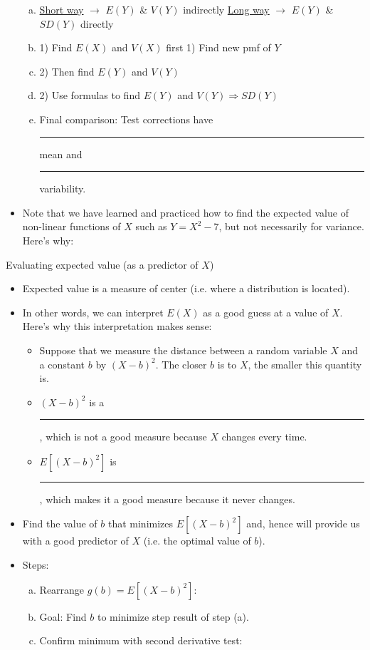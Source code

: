 \documentclass{article}
\newcommand{\blankul}[1]{\rule[-1.5mm]{#1}{0.15mm}}	%
\begin{document}
\begin{itemize}
\begin{enumerate}[(a)]
        \item[] \ul{Short way} $\rightarrow$ $E(Y)$ \& $V(Y)$ indirectly \hspace{10pt} \ul{Long way} $\rightarrow$ $E(Y)$ \& $SD(Y)$ directly
        \item[] 1) Find $E(X)$ and $V(X)$ first \hspace{85pt} 1) Find new pmf of $Y$
        \item[] \hfill 2) Then find $E(Y)$ and $V(Y)$\vspace{70pt}
        \item[] 2) Use formulas to find $E(Y)$ and $V(Y) \Rightarrow SD(Y)$\vspace{50pt}
        \item[] Final comparison: Test corrections have \blankul{2cm} mean and \blankul{2cm} variability.
    \end{enumerate}
    \item Note that we have learned and practiced how to find the expected value of non-linear functions of $X$ such as $Y = X^2 - 7$, but not necessarily for variance. Here's why:
\end{itemize}\vspace{140pt}

Evaluating expected value (as a predictor of $X$)\bigskip
\begin{itemize}
    \item Expected value is a measure of center (i.e. where a distribution is located).
    \item[] In other words, we can interpret $E(X)$ as a good guess at a value of $X$. Here's why this interpretation makes sense:
    \begin{itemize}
        \item Suppose that we measure the distance between a random variable $X$ and a constant $b$ by $(X - b)^2$. The closer $b$ is to $X$, the smaller this quantity is.
        \item[] $(X - b)^2$ is a \blankul{3cm}, which is not a good measure because $X$ changes every time.
        \item[] $E[(X - b)^2]$ is \blankul{2cm}, which makes it a good measure because it never changes.
    \end{itemize}\bigskip
    \item Find the value of $b$ that minimizes $E[(X - b)^2]$ and, hence will provide us with a good predictor of $X$ (i.e. the optimal value of $b$).
    \item[] Steps:
    \begin{enumerate}[(a)]
        \item Rearrange $g(b) = E[(X - b)^2]$:\vspace{50pt}
        \item Goal: Find $b$ to minimize step result of step (a).\vspace{80pt}
        \item Confirm minimum with second derivative test:\vspace{50pt}
    \end{enumerate}
\end{itemize}\bigskip
\end{document}
